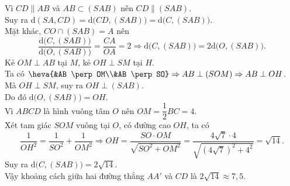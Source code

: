 \begin{ex}
{		Vì $CD \parallel AB$ và $AB \subset (SAB)$ nên $CD \parallel (SAB)$.\\
		Suy ra $\mathrm{d}(SA, CD) = \mathrm{d}\big(CD, (SAB)\big) = \mathrm{d}\big(C, (SAB)\big)$.\\
		Mặt khác, $CO \cap (SAB) = A$ nên
		\[\dfrac{\mathrm{d}\big(C, (SAB)\big)}{\mathrm{d}\big(O, (SAB)\big)} = \dfrac{CA}{OA} = 2 \Rightarrow \mathrm{d}\big(C, (SAB)\big) = 2\mathrm{d}\big(O, (SAB)\big).\]
		Kẻ $OM \perp AB$ tại $M$, kẻ $OH \perp SM$ tại $H$.\\
		Ta có $\heva{&AB \perp OM\\&AB \perp SO} \Rightarrow AB \perp (SOM) \Rightarrow AB \perp OH$.\\
		Mà $OH \perp SM$, suy ra $OH \perp (SAB)$.\\
		Do đó $\mathrm{d}\big(O, (SAB)\big) = OH$.\\
		Vì $ABCD$ là hình vuông tâm $O$ nên $OM = \dfrac{1}{2}BC = 4$.\\
		Xét tam giác $SOM$ vuông tại $O$, có đường cao $OH$, ta có
		\[\dfrac{1}{OH^2} = \dfrac{1}{SO^2} + \dfrac{1}{OM^2} \Rightarrow OH = \dfrac{SO \cdot OM}{\sqrt{SO^2 + OM^2}} = \dfrac{4\sqrt{7} \cdot 4}{\sqrt{\left(4\sqrt{7}\right)^2 + 4^2}} = \sqrt{14}.\]
		Suy ra $\mathrm{d}\big(C, (SAB)\big) = 2\sqrt{14}$.\\
		Vậy khoảng cách giữa hai đường thẳng $AA'$ và $CD$ là $2\sqrt{14} \approx 7{,}5$.
	}
\end{ex}

